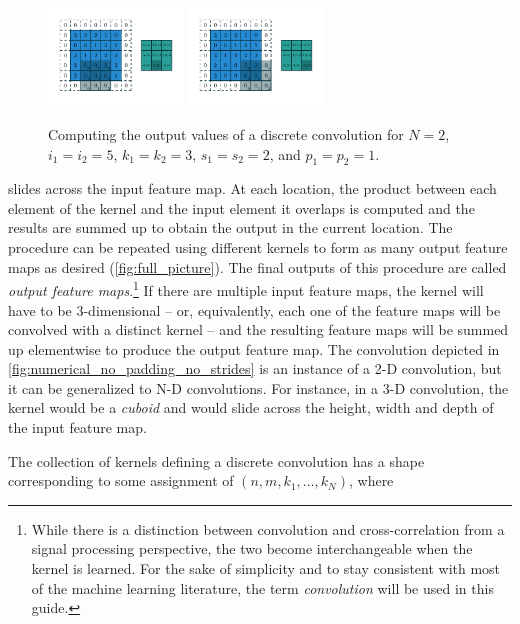 \begin{figure}[p]
    \includegraphics[width=0.32\textwidth]{pdf/numerical_padding_strides_07.pdf}
    \includegraphics[width=0.32\textwidth]{pdf/numerical_padding_strides_08.pdf}
    \caption{\label{fig:numerical_padding_strides} Computing the output values
        of a discrete convolution for $N = 2$, $i_1 = i_2 = 5$, $k_1 = k_2 = 3$,
        $s_1 = s_2 = 2$, and $p_1 = p_2 = 1$.}
\end{figure}

\noindent slides across the input feature map. At each location, the product
between each element of the kernel and the input element it overlaps is computed
and the results are summed up to obtain the output in the current location. The
procedure can be repeated using different kernels to form as many output feature
maps as desired (\autoref{fig:full_picture}). The final outputs of this procedure
are called {\em output feature maps}.\footnote{%
    While there is a distinction between convolution and cross-correlation from
    a signal processing perspective, the two become interchangeable when the
    kernel is learned. For the sake of simplicity and to stay consistent with
    most of the machine learning literature, the term {\em convolution\/}
    will be used in this guide.}
If there are multiple input feature maps, the kernel will have to be
3-dimensional -- or, equivalently, each one of the feature maps will be
convolved with a distinct kernel -- and the resulting feature maps will
be summed up elementwise to produce the output feature map. The convolution
depicted in \autoref{fig:numerical_no_padding_no_strides} is an instance of a
2-D convolution, but it can be generalized to N-D convolutions.  For instance,
in a 3-D convolution, the kernel would be a {\em cuboid\/} and would slide
across the height, width and depth of the input feature map.

The collection of kernels defining a discrete convolution has a shape
corresponding to some assignment of $(n, m, k_1, \ldots, k_N)$, where

